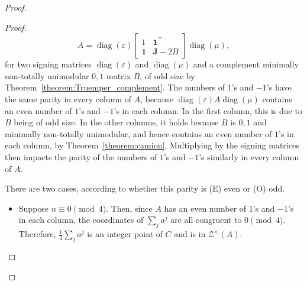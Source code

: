 \documentclass[11pt,a4paper]{amsart}
\newcommand\orange[1]{{\color{green!60!black}\rmfamily#1}}
\theoremstyle{plain}
\theoremstyle{definition}
\newcommand{\cal}[1]{\mathcal{#1}}
\DeclareMathOperator{\cone}{cone}
\renewcommand{\cal}[1]{\mathcal{#1}}
\DeclareMathOperator{\diag}{diag}
\begin{document}
\begin{proof}
\begin{proof}
\begin{equation}\label{equation:formula_R_with_sign}
	A = \diag(\varepsilon) \begin{bmatrix}
		1& \mathbf{1}^\top \\
		\mathbf{1} &  \mathbf{J} -2B
	\end{bmatrix}\diag(\mu),
\end{equation}
for two signing matrices $\diag(\varepsilon)$ and $\diag(\mu)$ and a complement minimally non-totally unimodular $0,\!1$ matrix $B$, of odd size by Theorem~\ref{theorem:Truemper_complement}.
The numbers of $1$'s and $-1$'s have the same parity in every column of $A$, because $\operatorname{diag}(\varepsilon) A \operatorname{diag}(\mu)$ contains an even number of $1$'s and $-1$'s in each column. In the first column, this is due to $B$ being of odd size. In the other columns, it holds because $B$ is $0,\!1$ and minimally non-totally unimodular, and hence contains an even number of $1$'s in each column, by Theorem~\ref{theorem:camion}.
Multiplying by the signing matrices then impacts the parity of the numbers of $1$'s and $-1$'s similarly in every column of $A$.

There are two cases, according to whether this parity is (E) even or (O) odd.

%		


\begin{itemize}
	\item[(E)]%
	Suppose $n\equiv 0\pmod{4}$.
	Then, since $A$ has an even number of $1$'s and $-1$'s in each column, the coordinates of $\sum_{j}a^j$ are all congruent to $0\pmod{4}$.
	Therefore, $\frac{1}{4}\sum_{j}a^j$ is an integer point of $C$ and is in $\cal{Z}^<(A)$.
	

\end{itemize}
\end{proof}
\end{proof}
\end{document}
